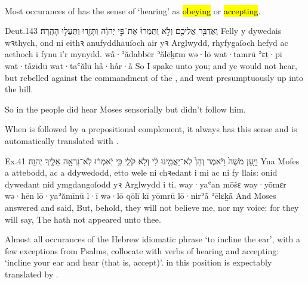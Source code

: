 \paragraph{}


\begin{paper}
	Most occurances of  has the sense of ‘hearing’ as \hl{obeying} or \hl{accepting}.
\end{paper}

\begin{example}{Deut.}{1}{43}{}{}
	\quoling
	{וָאֲדַבֵּ֥ר אֲלֵיכֶ֖ם וְלֹ֣א  וַתַּמְרוּ֙ אֶת־פִּ֣י יְהוָ֔ה וַתָּזִ֖דוּ וַתַּעֲל֥וּ הָהָֽרָה׃}
	{Felly y dywedais wꝛthych, ond ni  eithꝛ anufyddhauſoch air yꝛ Arglwydd, rhyfygaſoch hefyd ac aethoch i fynu i’r mynydd.}
	{wå̄·ʾăḏabbēr ʾălēḵɛm wə·lō  wat·tamrū ʾɛṯ·pī {\YHWH} wat·tå̄zīḏū wat·taʿălū hå̄·hå̄r·å̄}
	{So I spake unto you; and ye would not hear, but rebelled against the commandment of the {\LORD}, and went presumptuously up into the hill.}
\end{example}
\begin{paper}
	So in  the people did hear Moses sensorially but didn’t follow him.
\end{paper}

\begin{paper}
	When  is followed by a prepositional complement, it always has this sense and is automatically translated with .
\end{paper}
\begin{example}{Ex.}{4}{1}{}{}
	\quoling
	{וַיַּ֤עַן מֹשֶׁה֙ וַיֹּ֔אמֶר וְהֵן֙ לֹֽא־יַאֲמִ֣ינוּ לִ֔י וְלֹ֥א  קֹלִ֑י כִּ֣י יֹֽאמְר֔וּ לֹֽא־נִרְאָ֥ה אֵלֶ֖יךָ יְהוָֽה׃}
	{Yna Moſes a attebodd, ac a ddywedodd, etto wele ni chꝛedant i mi ac ni   fy llais: onid dywedant nid ymgdangoſodd yꝛ Arglwydd i ti.}
	{way·yaʿan mōšɛ way·yōmɛr wə·hēn lō·yaʾămīnū l·ī wə·lō  qōlī kī yōmrū lō·nirʾå̄ ʾēlɛḵå̄ {\YHWH}}
	{And Moses answered and said, But, behold, they will not believe me, nor   my voice: for they will say, The {\LORD} hath not appeared unto thee.}
\end{example}

\begin{paper}
	Almost all occurances of the Hebrew idiomatic phrase  ‘to incline the ear’, with a few exceptions from Psalms, collocate with verbs of hearing and accepting: ‘incline your ear and hear (that is, accept)’.  in this position is expectably translated by .
\end{paper}

